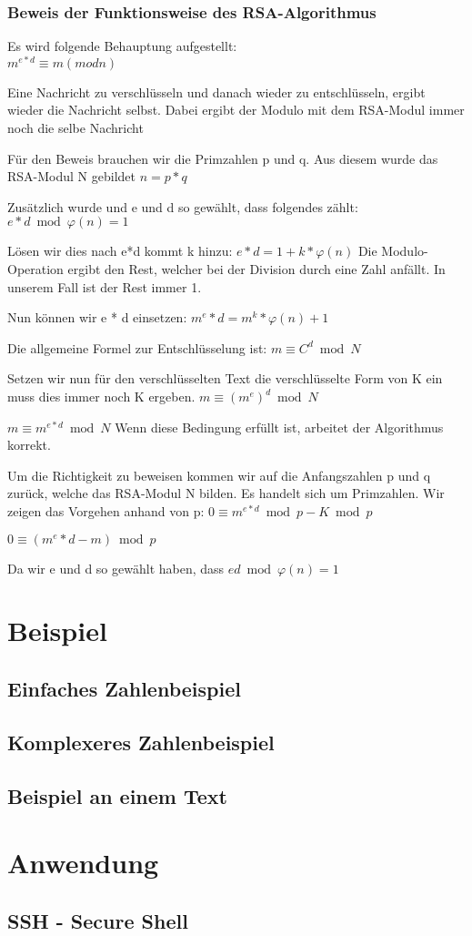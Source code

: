 \subsubsection{Beweis der Funktionsweise des RSA-Algorithmus}


Es wird folgende Behauptung aufgestellt: \\
$ m^{e*d} \equiv m (mod n) $

Eine Nachricht zu verschlüsseln und danach wieder zu entschlüsseln, ergibt wieder die Nachricht selbst. Dabei ergibt der Modulo mit dem RSA-Modul immer noch die selbe Nachricht

Für den Beweis brauchen wir die Primzahlen p und q. Aus diesem wurde das RSA-Modul N gebildet
$ n = p * q $

Zusätzlich wurde und e und d so gewählt, dass folgendes zählt:
$ e * d \bmod \varphi(n) = 1 $

Lösen wir dies nach e*d kommt k hinzu:
$ e * d = 1 + k * \varphi(n) $
Die Modulo-Operation ergibt den Rest, welcher bei der Division durch eine Zahl anfällt. In unserem Fall ist der Rest immer 1.

Nun können wir e * d einsetzen:
$ m^e*d = m^k*\varphi(n)+1 $


Die allgemeine Formel zur Entschlüsselung ist:
$ m \equiv C^d \bmod N $

Setzen wir nun für den verschlüsselten Text die verschlüsselte Form von K ein muss dies immer noch K ergeben.
$ m \equiv (m^e)^d \bmod N $

$ m \equiv m^{e*d} \bmod N $
Wenn diese Bedingung erfüllt ist, arbeitet der Algorithmus korrekt.

Um die Richtigkeit zu beweisen kommen wir auf die Anfangszahlen p und q zurück, welche das RSA-Modul N bilden. Es handelt sich um Primzahlen. Wir zeigen das Vorgehen anhand von p:
$ 0 \equiv m^{e*d} \bmod p - K \bmod p $

$ 0 \equiv (m^e*d-m) \bmod p $

Da wir e und d so gewählt haben, dass 
$ ed \bmod \varphi(n) = 1 $ 


\section{Beispiel}
\subsection{Einfaches Zahlenbeispiel}
\subsection{Komplexeres Zahlenbeispiel}
\subsection{Beispiel an einem Text}
\section{Anwendung}
\subsection{SSH - Secure Shell}
